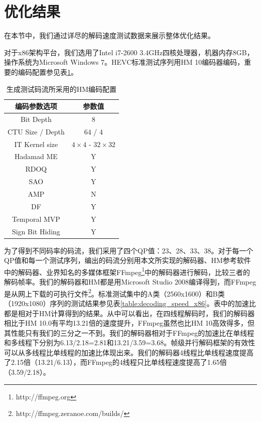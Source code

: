 \section{优化结果}

在本节中，我们通过详尽的解码速度测试数据来展示整体优化结果。

对于x86架构平台，我们选用了Intel i7-2600 3.4GHz四核处理器，机器内存8GB，操作系统为Microsoft Windows 7。HEVC标准测试序列用HM 10编码器编码，重要的编码配置参见表\ref{table:HM_config}。

\begin{table}[h]
	\begin{center}
		\caption{生成测试码流所采用的HM编码配置} \label{table:HM_config}
		\renewcommand{\arraystretch}{1.5}
		\begin{tabular}{c|c}
			\hline
			\textbf{编码参数选项} & \textbf{参数值} \\
			\hline
			\hline
			Bit Depth & $8$ \\
			\hline
			CTU Size / Depth & $64$ / $4$ \\
			\hline
			IT Kernel size & $4 \times 4$ - $32 \times 32$ \\
			\hline
			Hadamad ME & Y \\
			\hline
			RDOQ & Y \\
			\hline
			SAO & Y \\
			\hline
			AMP & N \\
			\hline
			DF & Y \\
			\hline
			Temporal MVP & Y \\
			\hline
			Sign Bit Hiding & Y \\
			\hline
		\end{tabular}
	\end{center}
\end{table}

为了得到不同码率的码流，我们采用了四个QP值：23、28、33、38。对于每一个QP值和每一个测试序列，编出的码流分别用本文所实现的解码器、HM参考软件中的解码器、业界知名的多媒体框架FFmpeg\footnote{http://ffmpeg.org}中的解码器进行解码，比较三者的解码帧率。我们的解码器和HM都是用Microsoft Studio 2008编译得到，而FFmpeg是从网上下载的可执行文件\footnote{http://ffmpeg.zeranoe.com/builds/}。标准测试集中的A类（2560x1600）和B类（1920x1080）序列的测试结果参见表\ref{table:decoding_speed_x86}。表中的加速比都是相对于HM计算得到的结果。从中可以看出，在四线程解码时，我们的解码器相比于HM 10.0有平均13.21倍的速度提升，FFmpeg虽然也比HM 10高效得多，但其性能只有我们的三分之一不到。我们的解码器相对于FFmpeg的加速比在单线程和多线程下分别为6.13/2.18=2.81和13.21/3.59=3.68。帧级并行解码框架的有效性可以从多线程比单线程的加速比体现出来。我们的解码器4线程比单线程速度提高了2.15倍（13.21/6.13），而FFmpeg的4线程只比单线程速度提高了1.65倍（3.59/2.18）。

